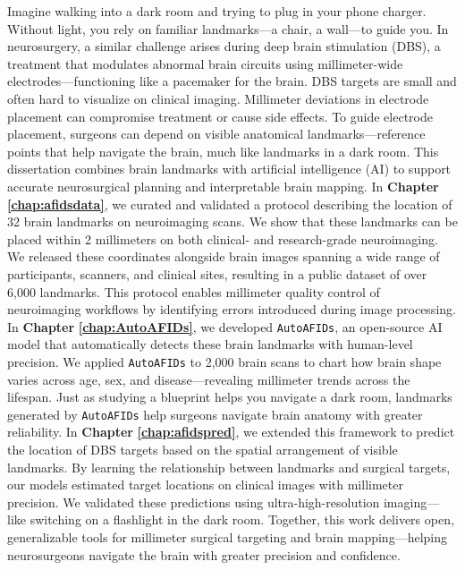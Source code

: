 \onehalfspacing
Imagine walking into a dark room and trying to plug in your phone charger. Without light, you rely on familiar landmarks—a chair, a wall—to guide you. In neurosurgery, a similar challenge arises during deep brain stimulation (DBS), a treatment that modulates abnormal brain circuits using millimeter-wide electrodes—functioning like a pacemaker for the brain. DBS targets are small and often hard to visualize on clinical imaging. Millimeter deviations in electrode placement can compromise treatment or cause side effects. To guide electrode placement, surgeons can depend on visible anatomical landmarks—reference points that help navigate the brain, much like landmarks in a dark room. This dissertation combines brain landmarks with artificial intelligence (AI) to support accurate neurosurgical planning and interpretable brain mapping. In \textbf{Chapter} \textbf{\ref{chap:afidsdata}}, we curated and validated a protocol describing the location of 32 brain landmarks on neuroimaging scans. We show that these landmarks can be placed within 2 millimeters on both clinical- and research-grade neuroimaging. We released these coordinates alongside brain images spanning a wide range of participants, scanners, and clinical sites, resulting in a public dataset of over 6,000 landmarks. This protocol enables millimeter quality control of neuroimaging workflows by identifying errors introduced during image processing. In \textbf{Chapter} \textbf{\ref{chap:AutoAFIDs}}, we developed \texttt{AutoAFIDs}, an open-source AI model that automatically detects these brain landmarks with human-level precision. We applied \texttt{AutoAFIDs} to 2,000 brain scans to chart how brain shape varies across age, sex, and disease—revealing millimeter trends across the lifespan. Just as studying a blueprint helps you navigate a dark room, landmarks generated by \texttt{AutoAFIDs} help surgeons navigate brain anatomy with greater reliability. In \textbf{Chapter} \textbf{\ref{chap:afidspred}}, we extended this framework to predict the location of DBS targets based on the spatial arrangement of visible landmarks. By learning the relationship between landmarks and surgical targets, our models estimated target locations on clinical images with millimeter precision. We validated these predictions using ultra-high-resolution imaging—like switching on a flashlight in the dark room. Together, this work delivers open, generalizable tools for millimeter surgical targeting and brain mapping—helping neurosurgeons navigate the brain with greater precision and confidence.
